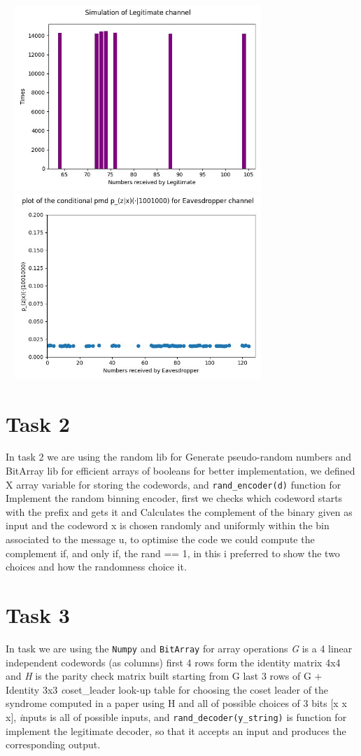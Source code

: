 \documentclass{report}
\begin{document}
 \includegraphics[width=10cm,height=7cm]{2}  \linebreak
  \includegraphics[width=10cm,height=7cm]{8}

  \section*{Task 2}
  In task 2 we are using the random lib for Generate pseudo-random numbers and BitArray lib for efficient arrays of booleans for better implementation, we defined X array variable for storing the codewords, and {\tt rand\_encoder(d)} function for Implement the random binning encoder, first we checks which codeword starts with the prefix and gets it and Calculates the complement of the binary given as input and the codeword x is chosen randomly and uniformly within the bin associated to the message u, to optimise the code we could compute the complement if, and only if, the rand == 1, in this i preferred to show the two choices and how the randomness choice it.
\section*{Task 3}
In task we are using the {\tt Numpy} and {\tt BitArray} for array operations {\textit G}  is a 4 linear independent codewords (as columns)
first 4 rows form the identity matrix 4x4 and {\textit H} is the parity check matrix built starting from G last 3 rows of G + Identity 3x3 {\textit coset\_leader} look-up table for choosing the coset leader of the syndrome computed in a paper using H and all of possible choices of 3 bits [x x x], {\textit inputs} is all of possible inputs, and {\tt rand\_decoder(y\_string)} is function for implement the legitimate decoder, so that it accepts an
input and produces the corresponding output.
\end{document}
